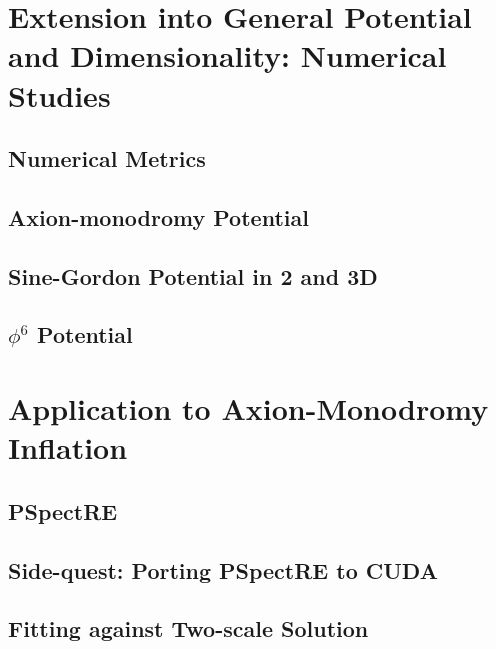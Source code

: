\documentclass{report}
\begin{document}
\chapter{Extension into General Potential and Dimensionality: Numerical Studies}
\section{Numerical Metrics}
\section{Axion-monodromy Potential}
\section{Sine-Gordon Potential in 2 and 3D}
\section{$\phi^6$ Potential}

\chapter{Application to Axion-Monodromy Inflation}
\section{PSpectRE}
\section{Side-quest: Porting PSpectRE to CUDA}
\section{Fitting against Two-scale Solution}
\end{document}
